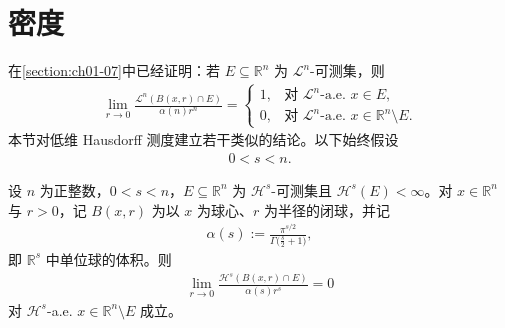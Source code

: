 \documentclass[../../main.tex]{subfiles}%
\begin{document}
\section{密度}\label{section:ch02-03}

在\cref{section:ch01-07}中已经证明：若 $E\subseteq\mathbb{R}^n$ 为 $\mathcal{L}^n$-可测集，则%
\begin{align*}
\lim_{r\to0}\frac{\mathcal{L}^n(B(x,r)\cap E)}{\alpha(n)r^n}=
\begin{cases}
1, & \text{对 } \mathcal{L}^n\text{-a.e. } x\in E,\\
0, & \text{对 } \mathcal{L}^n\text{-a.e. } x\in\mathbb{R}^n\setminus E .
\end{cases}
\end{align*}
本节对低维 Hausdorff 测度建立若干类似的结论。以下始终假设
\begin{align*}
0<s<n .
\end{align*}

\begin{theorem}[$E$ 之外的点的密度]\label{theorem:ch02-2-6}
设 $n$ 为正整数，$0<s<n$，$E\subseteq\mathbb{R}^n$ 为 $\mathcal{H}^s$-可测集且 $\mathcal{H}^s(E)<\infty$。对 $x\in\mathbb{R}^n$ 与 $r>0$，记 $B(x,r)$ 为以 $x$ 为球心、$r$ 为半径的闭球，并记
\begin{align*}
\alpha(s):=\frac{\pi^{s/2}}{\Gamma\bigl(\frac{s}{2}+1\bigr)} ,
\end{align*}
即 $\mathbb{R}^s$ 中单位球的体积。则
\begin{align*}
\lim_{r\to0}\frac{\mathcal{H}^s(B(x,r)\cap E)}{\alpha(s)r^s}=0
\end{align*}
对 $\mathcal{H}^s$-a.e. $x\in\mathbb{R}^n\setminus E$ 成立。
\end{theorem}
\end{document}
